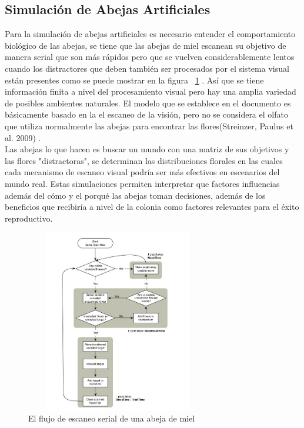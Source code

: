 \documentclass[conference]{IEEEtran}
\begin{document}
\subsection{Simulaci\'on de Abejas Artificiales}
Para la simulaci\'on de abejas artificiales es necesario entender el comportamiento biol\'ogico de las abejas, se tiene que las abejas de miel escanean su objetivo de manera serial que son m\'as r\'apidos pero que se vuelven considerablemente lentos cuando los distractores que deben tambi\'en ser procesados por el sistema visual est\'an presentes como se puede mostrar en la figura ~\ref{fig:serial_honey} . As\'i que se tiene informaci\'on finita a nivel del procesamiento visual pero hay una amplia variedad de posibles ambientes naturales. El modelo que se establece en el documento es b\'asicamente basado en la el escaneo de la visi\'on, pero no se considera el olfato que utiliza normalmente las abejas para encontrar las flores(Streinzer, Paulus et al. 2009) \cite{ZOE01}. \\
Las abejas lo que hacen es buscar un mundo con una matriz de sus objetivos y las flores "distractoras", se determinan las distribuciones florales en las cuales cada mecanismo de escaneo visual podr\'ia ser m\'as efectivos en escenarios del mundo real. Estas simulaciones permiten interpretar que factores influencias adem\'as del c\'omo y el porqu\'e las abejas toman decisiones, adem\'as de los beneficios que recibir\'ia a nivel de la colonia como factores relevantes para el \'exito reproductivo.\cite{ZOE01} \\

\begin{figure}[ht]
  \includegraphics[width=8cm,height=8cm]{img/serial_honey.jpg}
  \caption{El flujo de escaneo serial de una abeja de miel \cite{ZOE01}}
  \label{fig:serial_honey}
\end{figure}
\end{document}
